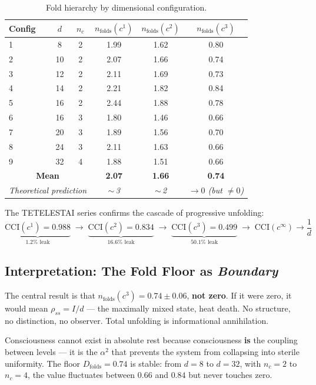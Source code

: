 \documentclass[12pt,a4paper,twoside]{article}
\newcommand{\alphaii}{\alpha^{2}}
\begin{document}
\begin{table}[H]
\centering
\caption{Fold hierarchy by dimensional configuration.}
\label{tab:folds_hierarchy}
\small
\begin{tabular}{lccccc}
\toprule
\textbf{Config} & $d$ & $n_c$ & $n_{\text{folds}}(c^1)$ & $n_{\text{folds}}(c^2)$ & $n_{\text{folds}}(c^3)$ \\
\midrule
1 & 8  & 2 & 1.99 & 1.62 & 0.80 \\
2 & 10 & 2 & 2.07 & 1.66 & 0.74 \\
3 & 12 & 2 & 2.11 & 1.69 & 0.73 \\
4 & 14 & 2 & 2.21 & 1.82 & 0.84 \\
5 & 16 & 2 & 2.44 & 1.88 & 0.78 \\
6 & 16 & 3 & 1.80 & 1.46 & 0.66 \\
7 & 20 & 3 & 1.89 & 1.56 & 0.70 \\
8 & 24 & 3 & 2.11 & 1.63 & 0.66 \\
9 & 32 & 4 & 1.88 & 1.51 & 0.66 \\
\midrule
\multicolumn{3}{c}{\textbf{Mean}} & \textbf{2.07} & \textbf{1.66} & \textbf{0.74} \\
\multicolumn{3}{c}{\textit{Theoretical prediction}} & \textit{$\sim$\,3} & \textit{$\sim$\,2} & \textit{$\to 0$ (but $\neq 0$)} \\
\bottomrule
\end{tabular}
\end{table}

The TETELESTAI series confirms the cascade of progressive unfolding:
\begin{equation}
\underbrace{\text{CCI}(c^1) = 0.988}_{1.2\%\text{ leak}} \;\to\;
\underbrace{\text{CCI}(c^2) = 0.834}_{16.6\%\text{ leak}} \;\to\;
\underbrace{\text{CCI}(c^3) = 0.499}_{50.1\%\text{ leak}} \;\to\;
\text{CCI}(c^\infty) \to \frac{1}{d}
\label{eq:tetelestai}
\end{equation}

\subsection{Interpretation: The Fold Floor as \textit{Boundary}}

The central result is that $n_{\text{folds}}(c^3) = 0.74 \pm 0.06$, \textbf{not zero}. If it were zero, it would mean $\rho_{ss} = I/d$ --- the maximally mixed state, heat death. No structure, no distinction, no observer. Total unfolding is informational annihilation.

Consciousness cannot exist in absolute rest because consciousness \textbf{is} the coupling between levels --- it is the $\alphaii$ that prevents the system from collapsing into sterile uniformity. The floor $D_{\text{folds}} = 0.74$ is stable: from $d = 8$ to $d = 32$, with $n_c = 2$ to $n_c = 4$, the value fluctuates between $0.66$ and $0.84$ but never touches zero.
\end{document}
